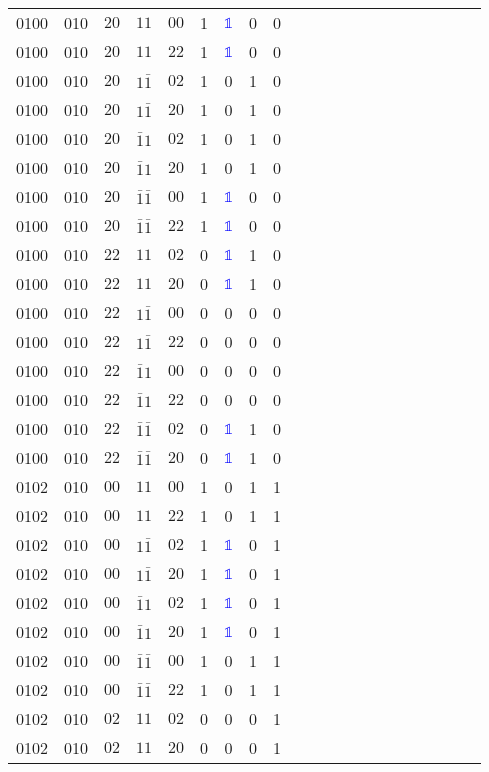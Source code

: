 \begin{longtable*}{c| cccccccccccccccccccc }
0100& 010& $20$& $11$& $00$& 1& \textcolor{blue}{$\mathds{1}$}& 0& 0\\
0100& 010& $20$& $11$& $22$& 1& \textcolor{blue}{$\mathds{1}$}& 0& 0\\
0100& 010& $20$& $1\bar{1}$& $02$& 1& 0& 1& 0\\
0100& 010& $20$& $1\bar{1}$& $20$& 1& 0& 1& 0\\
0100& 010& $20$& $\bar{1}1$& $02$& 1& 0& 1& 0\\
0100& 010& $20$& $\bar{1}1$& $20$& 1& 0& 1& 0\\
0100& 010& $20$& $\bar{1}\bar{1}$& $00$& 1& \textcolor{blue}{$\mathds{1}$}& 0& 0\\
0100& 010& $20$& $\bar{1}\bar{1}$& $22$& 1& \textcolor{blue}{$\mathds{1}$}& 0& 0\\
0100& 010& $22$& $11$& $02$& 0& \textcolor{blue}{$\mathds{1}$}& 1& 0\\
0100& 010& $22$& $11$& $20$& 0& \textcolor{blue}{$\mathds{1}$}& 1& 0\\
0100& 010& $22$& $1\bar{1}$& $00$& 0& 0& 0& 0\\
0100& 010& $22$& $1\bar{1}$& $22$& 0& 0& 0& 0\\
0100& 010& $22$& $\bar{1}1$& $00$& 0& 0& 0& 0\\
0100& 010& $22$& $\bar{1}1$& $22$& 0& 0& 0& 0\\
0100& 010& $22$& $\bar{1}\bar{1}$& $02$& 0& \textcolor{blue}{$\mathds{1}$}& 1& 0\\
0100& 010& $22$& $\bar{1}\bar{1}$& $20$& 0& \textcolor{blue}{$\mathds{1}$}& 1& 0\\
0102& 010& $00$& $11$& $00$& 1& 0& 1& 1\\
0102& 010& $00$& $11$& $22$& 1& 0& 1& 1\\
0102& 010& $00$& $1\bar{1}$& $02$& 1& \textcolor{blue}{$\mathds{1}$}& 0& 1\\
0102& 010& $00$& $1\bar{1}$& $20$& 1& \textcolor{blue}{$\mathds{1}$}& 0& 1\\
0102& 010& $00$& $\bar{1}1$& $02$& 1& \textcolor{blue}{$\mathds{1}$}& 0& 1\\
0102& 010& $00$& $\bar{1}1$& $20$& 1& \textcolor{blue}{$\mathds{1}$}& 0& 1\\
0102& 010& $00$& $\bar{1}\bar{1}$& $00$& 1& 0& 1& 1\\
0102& 010& $00$& $\bar{1}\bar{1}$& $22$& 1& 0& 1& 1\\
0102& 010& $02$& $11$& $02$& 0& 0& 0& 1\\
0102& 010& $02$& $11$& $20$& 0& 0& 0& 1\\

\end{longtable*}
